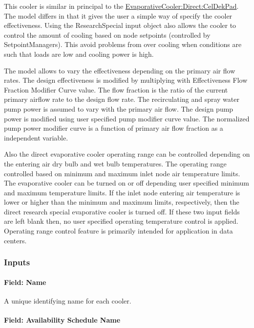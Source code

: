 This cooler is similar in principal to the \hyperref[evaporativecoolerdirectceldekpad]{EvaporativeCooler:Direct:CelDekPad}. The model differs in that it gives the user a simple way of specify the cooler effectiveness. Using the ResearchSpecial input object also allows the cooler to control the amount of cooling based on node setpoints (controlled by SetpointManagers). This avoid problems from over cooling when conditions are such that loads are low and cooling power is high.

The model allows to vary the effectiveness depending on the primary air flow rates. The design effectiveness is modified by multiplying with Effectiveness Flow Fraction Modifier Curve value. The flow fraction is the ratio of the current primary airflow rate to the design flow rate. The recirculating and spray water pump power is assumed to vary with the primary air flow. The design pump power is modified using user specified pump modifier curve value. The normalized pump power modifier curve is a function of primary air flow fraction as a independent variable.

Also the direct evaporative cooler operating range can be controlled depending on the entering air dry bulb and wet bulb temperatures. The operating range controlled based on minimum and maximum inlet node air temperature limits. The evaporative cooler can be turned on or off depending user specified minimum and maximum temperature limits. If the inlet node entering air temperature is lower or higher than the minimum and maximum limits, respectively, then the direct research special evaporative cooler is turned off. If these two input fields are left blank then, no user specified operating temperature control is applied. Operating range control feature is primarily intended for application in data centers.

\subsubsection{Inputs}\label{inputs-1-014}

\paragraph{Field: Name}\label{field-name-1-013}

A unique identifying name for each cooler.

\paragraph{Field: Availability Schedule Name}\label{field-availability-schedule-name-006}

